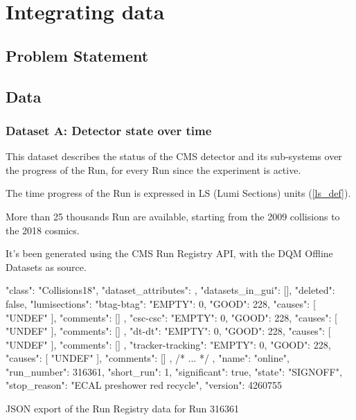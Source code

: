 \chapter{Integrating data}
\label{dataset}
\section{Problem Statement}

\section{Data}

\subsection{Dataset A: Detector state over time}

This dataset describes the status of the CMS detector and its sub-systems over the progress of the Run, for every Run since the experiment is active.

The time progress of the Run is expressed in LS (Lumi Sections) units (\ref{ls_def}).

More than 25 thousands Run are available, starting from the 2009 collisions to the 2018 cosmics.

It's been generated using the CMS Run Registry API, with the DQM Offline Datasets as source.

\begin{listing}[H]
\begin{jsoncode}
  {
    "class": "Collisions18",
    "dataset_attributes": {},
    "datasets_in_gui": [],
    "deleted": false,
    "lumisections": {
      "btag-btag": {
        "EMPTY": 0,
        "GOOD": 228,
        "causes": [
          "UNDEF"
        ],
        "comments": []
      },
      "csc-csc": {
        "EMPTY": 0,
        "GOOD": 228,
        "causes": [
          "UNDEF"
        ],
        "comments": []
      },
      "dt-dt": {
        "EMPTY": 0,
        "GOOD": 228,
        "causes": [
          "UNDEF"
        ],
        "comments": []
      },
      "tracker-tracking": {
        "EMPTY": 0,
        "GOOD": 228,
        "causes": [
          "UNDEF"
        ],
        "comments": []
      },
      /* ... */
    },
    "name": "online",
    "run_number": 316361,
    "short_run": 1,
    "significant": true,
    "state": "SIGNOFF",
    "stop_reason": "ECAL preshower red recycle",
    "version": 4260755
  }
\end{jsoncode}
\caption{JSON export of the Run Registry data for Run 316361}
\end{listing}

